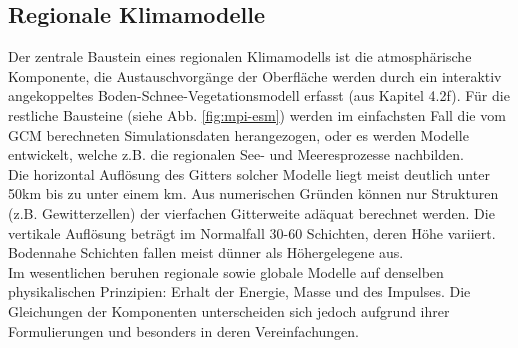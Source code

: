 \subsection{Regionale Klimamodelle}
Der zentrale Baustein eines regionalen Klimamodells ist die atmosphärische Komponente, die Austauschvorgänge der Oberfläche werden durch ein interaktiv angekoppeltes Boden-Schnee-Vegetationsmodell erfasst (aus \cite{RCM} Kapitel 4.2f). Für die restliche Bausteine (siehe Abb. \ref{fig:mpi-esm}) werden im einfachsten Fall die vom GCM berechneten Simulationsdaten herangezogen, oder es werden Modelle entwickelt, welche z.B. die regionalen See- und Meeresprozesse nachbilden.\\
Die horizontal Auflösung des Gitters solcher Modelle liegt meist deutlich unter 50km bis zu unter einem km. Aus numerischen Gründen können nur Strukturen (z.B. Gewitterzellen) der vierfachen Gitterweite adäquat berechnet werden. Die vertikale Auflösung beträgt im Normalfall 30-60 Schichten, deren Höhe variiert. Bodennahe Schichten fallen meist dünner als Höhergelegene aus.\\
Im wesentlichen beruhen regionale sowie globale Modelle auf denselben physikalischen Prinzipien: Erhalt der Energie, Masse und des Impulses. Die Gleichungen der Komponenten unterscheiden sich jedoch aufgrund ihrer Formulierungen und besonders in deren Vereinfachungen.
